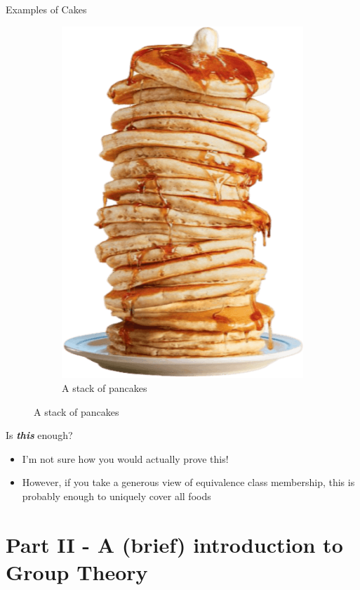 \documentclass{beamer}
\begin{document}
\begin{frame}{Examples of Cakes}
\begin{figure}
\begin{subfigure}{.35\textwidth}
          \includegraphics[width=.8\linewidth]{images/cube_rule_of_food/cake/33_flapjacks.png}
          \caption{\label{fig:pancake-stack}A stack of pancakes}
        \end{subfigure}
    \end{figure}
\end{frame}


\begin{frame}{Is \textit{\textbf{this}} enough?}
    \begin{itemize}
        \item I'm not sure how you would actually prove this!
        \item However, if you take a generous view of equivalence class membership, this is probably enough to uniquely cover all foods
    \end{itemize}
\end{frame}


\section{Part II - A (brief) introduction to Group Theory}
\end{document}
